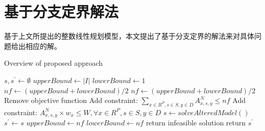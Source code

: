 \section{基于分支定界解法}
基于上文所提出的整数线性规划模型，本文提出了基于分支定界的解法来对具体问题给出相应的解。 

\begin{algorithm} 
	\caption{Overview of proposed approach}  
	\label{alg:approach}  
	\begin{algorithmic} [1]		
		\State $s,s^{\prime} \leftarrow \emptyset$
		\State $upperBound \leftarrow |I|$
		\State $lowerBound \leftarrow 1$
		\State $nf \leftarrow (upperBound + lowerBound)/2$
		\State $nf \leftarrow (upperBound + lowerBound)/2 $
		\State Remove objective function
		\State Add constraint: $\sum_{x\in R^{P}, s \in S, y\in D}A_{x,s,y}^{N} \leq nf$
		\State Add constraint: $ A_{x,s,y}^{N} \times w_{x} \leq W, \forall x\in R^{P}, s \in S, y \in D $
		\State $s \leftarrow solveAlteredModel()$
		\State $s^{\prime} \leftarrow s$
		\State $upperBound \leftarrow nf$
		\Else	
		\State $lowerBound \leftarrow nf$	
		\EndIf
		\EndWhile		 
		\State return infeasible solution
		\Else
		\State return $s^{\prime}$
		\EndIf
	\end{algorithmic}  
\end{algorithm} 

